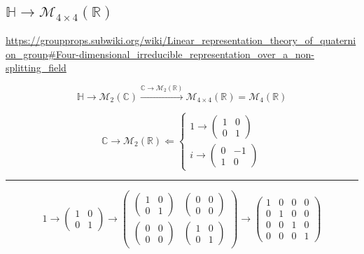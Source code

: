 \documentclass[
]{book}
\theoremstyle{definition}
\theoremstyle{definition}
\theoremstyle{definition}
\theoremstyle{definition}
\theoremstyle{remark}
\begin{document}
\hypertarget{mathbbhrightarrowmathcalm_4times4leftmathbbrright}{%
\subsection{\texorpdfstring{\(\mathbb{H}\rightarrow\mathcal{M}_{4\times4}\left(\mathbb{R}\right)\)}{\textbackslash mathbb\{H\}\textbackslash rightarrow\textbackslash mathcal\{M\}\_\{4\textbackslash times4\}\textbackslash left(\textbackslash mathbb\{R\}\textbackslash right)}}\label{mathbbhrightarrowmathcalm_4times4leftmathbbrright}}

\url{https://groupprops.subwiki.org/wiki/Linear_representation_theory_of_quaternion_group\#Four-dimensional_irreducible_representation_over_a_non-splitting_field}

\[
\mathbb{H}\rightarrow\mathcal{M}_{2}\left(\mathbb{C}\right)\overset{\mathbb{C}\rightarrow\mathcal{M}_{2}\left(\mathbb{R}\right)}{\rightarrow}\mathcal{M}_{4\times4}\left(\mathbb{R}\right)=\mathcal{M}_{4}\left(\mathbb{R}\right)
\]

\[
\mathbb{C}\rightarrow\mathcal{M}_{2}\left(\mathbb{R}\right)\Leftarrow\begin{cases}
1\rightarrow\begin{pmatrix}1 & 0\\
0 & 1
\end{pmatrix}\\
i\rightarrow\begin{pmatrix}0 & -1\\
1 & 0
\end{pmatrix}
\end{cases}
\]

\begin{center}\rule{0.5\linewidth}{0.5pt}\end{center}

\[
1\rightarrow\begin{pmatrix}1 & 0\\
0 & 1
\end{pmatrix}\rightarrow\begin{pmatrix}\begin{pmatrix}1 & 0\\
0 & 1
\end{pmatrix} & \begin{pmatrix}0 & 0\\
0 & 0
\end{pmatrix}\\
\begin{pmatrix}0 & 0\\
0 & 0
\end{pmatrix} & \begin{pmatrix}1 & 0\\
0 & 1
\end{pmatrix}
\end{pmatrix}\rightarrow\begin{pmatrix}1 & 0 & 0 & 0\\
0 & 1 & 0 & 0\\
0 & 0 & 1 & 0\\
0 & 0 & 0 & 1
\end{pmatrix}
\]
\end{document}
